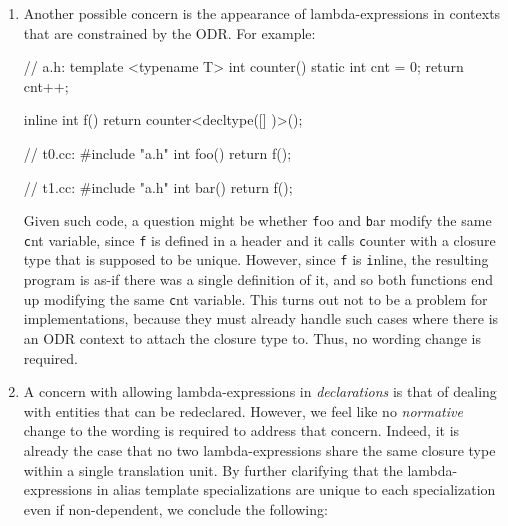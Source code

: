 \documentclass{wg21}
\newcommand{\cc}[1]{\texttt{#1}}
\begin{document}
\begin{enumerate}
    Thus, a function template declaration such as the following will require the
    implementation to make the lambda-expression part of the signature, which is
    specifically what we would like to avoid:
\begin{cpp}
template <unsigned N>
void f(const char (*s)[([]() { return N; })()]) { }
\end{cpp}

    To make sure this does not happen, we propose \hyperref[wording.template]
    {amending \textbf{[temp.over.link]}}.


  \item \label{discussion.ODR}
    Another possible concern is the appearance of lambda-expressions in
    contexts that are constrained by the ODR. For example:

\begin{cpp}
// a.h:
template <typename T>
int counter() {
  static int cnt = 0;
  return cnt++;
}

inline int f() {
  return counter<decltype([] {})>();
}

// t0.cc:
#include "a.h"
int foo() { return f(); }

// t1.cc:
#include "a.h"
int bar() { return f(); }
\end{cpp}

    Given such code, a question might be whether \cc foo and \cc bar modify
    the same \cc cnt variable, since \cc f is defined in a header and it calls
    \cc counter with a closure type that is supposed to be unique. However,
    since \cc f is \cc inline, the resulting program is as-if there was a
    single definition of it, and so both functions end up modifying the same
    \cc cnt variable. This turns out not to be a problem for implementations,
    because they must already handle such cases where there is an ODR context
    to attach the closure type to. Thus, no wording change is required.


  \item \label{discussion.redeclarations}
    A concern with allowing lambda-expressions in \textit{declarations} is
    that of dealing with entities that can be redeclared. However, we feel like
    no \textit{normative} change to the wording is required to address that concern.
    Indeed, it is already the case that no two lambda-expressions share the same
    closure type within a single translation unit. By further clarifying that the
    lambda-expressions in alias template specializations are unique to each
    specialization even if non-dependent, we conclude the following:


\end{enumerate}
\end{document}
